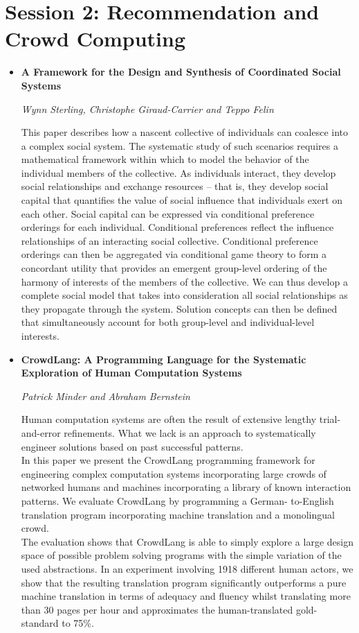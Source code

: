\documentclass[a4paper,12pt,svgnames]{report}
\begin{document}
\section{Session 2: Recommendation and Crowd Computing}
\begin{itemize}
\item \textbf{A Framework for the Design and Synthesis of Coordinated Social
Systems}

\textit{Wynn Sterling, Christophe Giraud-Carrier and Teppo Felin}

This paper describes how a nascent collective of individuals can coalesce into a
complex social system. The systematic study of such scenarios requires a
mathematical framework within which to model the behavior of the individual
members of the collective. As individuals interact, they develop social
relationships and exchange resources -- that is, they develop social capital
that quantifies the value of social influence that individuals exert on each
other. Social capital can be expressed via conditional preference orderings for
each individual. Conditional preferences reflect the influence relationships of
an interacting social collective. Conditional preference orderings can then be
aggregated via conditional game theory to form a concordant utility that
provides an emergent group-level ordering of the harmony of interests of the
members of the collective. We can thus develop a complete social model that
takes into consideration all social relationships as they propagate through the
system. Solution concepts can then be defined that simultaneously account for
both group-level and individual-level interests.

\item \textbf{CrowdLang: A Programming Language for the Systematic Exploration
of Human Computation Systems}

\textit{Patrick Minder and Abraham Bernstein}

Human computation systems are often the result of extensive lengthy
trial-and-error refinements. What we lack is an approach to systematically
engineer solutions based on past successful patterns.\\
In this paper we present the CrowdLang programming framework for engineering
complex computation systems incorporating large crowds of networked humans and
machines incorporating a library of known interaction patterns. We evaluate
CrowdLang by programming a German- to-English translation program incorporating
machine translation and a monolingual crowd.\\
The evaluation shows that CrowdLang is able to simply explore a large design
space of possible problem solving programs with the simple variation of the used
abstractions. In an experiment involving 1918 different human actors, we show
that the resulting translation program significantly outperforms a pure machine
translation in terms of adequacy and fluency whilst translating more than 30
pages per hour and approximates the human-translated gold-standard to 75\%.



\end{itemize}
\end{document}
